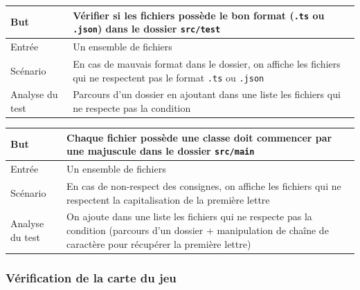 \begin{center}
    \centering
    \begin{tabular}[h]{|m{4cm}|m{12cm}|} 
        \hline
        \rowcolor[HTML]{F8B400}
        \textbf{But} & Vérifier si les fichiers possède le bon format (\texttt{.ts} ou \texttt{.json}) dans le dossier \texttt{src/test} \\
        \hline
        \hline
        \rowcolor[HTML]{F7F7F7}
        Entrée & Un ensemble de fichiers \\
        \hline
        \rowcolor[HTML]{F7F7F7}
        Scénario & En cas de mauvais format dans le dossier, on affiche les fichiers qui ne respectent pas le format \texttt{.ts} ou \texttt{.json}\\
        \hline
        \rowcolor[HTML]{F7F7F7}
        Analyse du test & Parcours d'un dossier en ajoutant dans une liste les fichiers qui ne respecte pas la condition \\
        \hline
    \end{tabular}
\end{center}

\begin{center}
    \centering
    \begin{tabular}[h]{|m{4cm}|m{12cm}|} 
        \hline
        \rowcolor[HTML]{F8B400}
        \textbf{But} & Chaque fichier possède une classe doit commencer par une majuscule dans le dossier \texttt{src/main} \\
        \hline
        \hline
        \rowcolor[HTML]{F7F7F7}
        Entrée & Un ensemble de fichiers \\
        \hline
        \rowcolor[HTML]{F7F7F7}
        Scénario & En cas de non-respect des consignes, on affiche les fichiers qui ne respectent la capitalisation de la première lettre\\
        \hline
        \rowcolor[HTML]{F7F7F7}
        Analyse du test & On ajoute dans une liste les fichiers qui ne respecte pas la condition (parcours d'un dossier + manipulation de chaîne de caractère pour récupérer la première lettre) \\
        \hline
    \end{tabular}
\end{center}

\subsubsection{Vérification de la carte du jeu}

